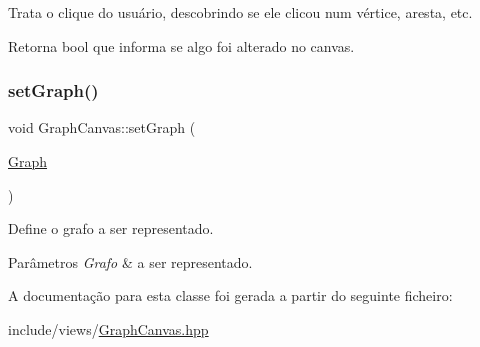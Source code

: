 Trata o clique do usuário, descobrindo se ele clicou num vértice, aresta, etc. \begin{DoxyReturn}{Retorna}
bool que informa se algo foi alterado no canvas. 
\end{DoxyReturn}
\mbox{\label{classGraphCanvas_a1f402e85859d1eb3b6f1965de3def1af}} 
\subsubsection{\texorpdfstring{set\+Graph()}{setGraph()}}
{\footnotesize\ttfamily void Graph\+Canvas\+::set\+Graph (\begin{DoxyParamCaption}\item[{\hyperlink{classGraph}{Graph}}]{ }\end{DoxyParamCaption})}

Define o grafo a ser representado. 
\begin{DoxyParams}{Parâmetros}
{\em Grafo} & a ser representado. \\
\hline
\end{DoxyParams}


A documentação para esta classe foi gerada a partir do seguinte ficheiro\+:\begin{DoxyCompactItemize}
\item 
include/views/\hyperlink{GraphCanvas_8hpp}{Graph\+Canvas.\+hpp}\end{DoxyCompactItemize}
